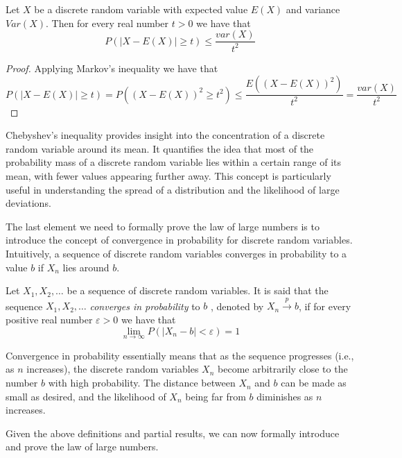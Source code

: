 \begin{corollary}
 Let $X$ be a discrete random variable with expected value $E(X)$ and variance $Var(X)$. Then for every real number $t > 0$ we have that
\[
P \left( \left| X - E(X) \right| \geq t \right) \leq \frac{var(X)}{t^2}
\]
\end{corollary}
\begin{proof}
Applying Markov's inequality we have that
\[
P \left( \left| X - E(X) \right| \geq t \right) = P \left( \left( X - E(X) \right)^2 \geq t^2 \right) \leq \frac{E \left( \left( X - E(X) \right)^2 \right)}{t^2} = \frac{var(X)}{t^2}
\]
\end{proof}

Chebyshev's inequality provides insight into the concentration of a discrete random variable around its mean. It quantifies the idea that most of the probability mass of a discrete random variable lies within a certain range of its mean, with fewer values appearing further away. This concept is particularly useful in understanding the spread of a distribution and the likelihood of large deviations.

The last element we need to formally prove the law of large numbers is to introduce the concept of convergence in probability for discrete random variables. Intuitively, a sequence of discrete random variables converges in probability to a value $b$ if $X_n$ lies around $b$.

\begin{definition}
Let $X_{1}, X_{2}, \ldots$ be a sequence of discrete random variables. It is said that the sequence $X_{1}, X_{2}, \ldots$ \emph{converges in probability} to $b$ , denoted by $X_{n} \overset{p}{\rightarrow}b$, if for every positive real number $\varepsilon>0$ we have that
\[
\lim_{n \rightarrow \infty} P \left( \left| X_{n} - b \right| < \varepsilon \right) = 1
\]
\end{definition}

Convergence in probability essentially means that as the sequence progresses (i.e., as $n$ increases), the discrete random variables $X_n$ become arbitrarily close to the number $b$ with high probability. The distance between $X_n$ and $b$ can be made as small as desired, and the likelihood of $X_n$ being far from $b$ diminishes as $n$ increases.

Given the above definitions and partial results, we can now formally introduce and prove the law of large numbers.

